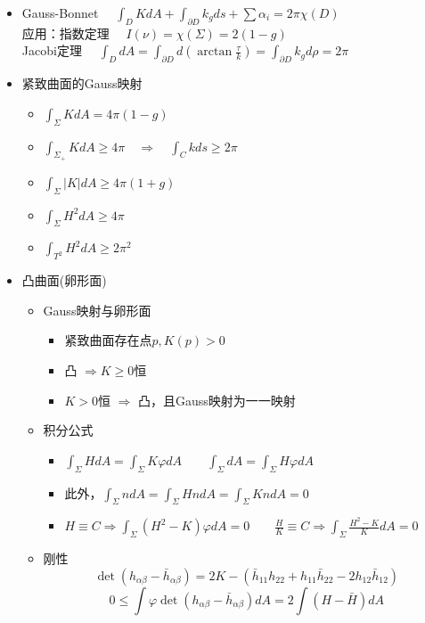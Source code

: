 \documentclass{ctexart}
\begin{document}
\begin{itemize}
	\item Gauss-Bonnet $\displaystyle\quad \int_{D}KdA+\int_{\partial D}k_g ds +\sum \alpha_i =2\pi \chi(D)$\\[0.3cm]
	应用：指数定理 $\quad I(\nu) =\chi (\Sigma) =2(1-g)$\\[0.15cm]
	\phantom{应用：}Jacobi定理 $\displaystyle\quad \int_{D}dA=\int_{\partial D} d(\arctan \frac{\tau}{k})=\int_{\partial D}k_gd\rho =2\pi$
	\item 紧致曲面的Gauss映射
	\begin{itemize}
		\item $\displaystyle \int_{\Sigma}KdA=4\pi(1-g)$
		\item $\displaystyle\int_{\Sigma_+}KdA \geqslant 4\pi \quad \Rightarrow \quad \int_{C}kds \geqslant 2\pi$
		\item $\displaystyle\int_{\Sigma}|K|dA \geqslant 4\pi(1+g)$
		\item $\displaystyle\int_{\Sigma}H^2dA \geqslant 4\pi$
		\item $\displaystyle\int_{T^2}H^2dA \geqslant 2\pi^2$
	\end{itemize}
	\item 凸曲面(卵形面)
	\begin{itemize}
		\item Gauss映射与卵形面
		\begin{itemize}
			\item 紧致曲面存在点$p, K(p)>0$
			\item 凸 $\Rightarrow K \geqslant 0$恒
			\item $K>0$恒 $\Rightarrow$ 凸，且Gauss映射为一一映射
		\end{itemize}
		\item 积分公式
		\begin{itemize}
			\item $\displaystyle\int_{\Sigma}HdA=\int_{\Sigma}K\varphi dA \qquad \int_{\Sigma}dA=\int_{\Sigma}H\varphi dA$
			\item 此外，$\displaystyle\int_{\Sigma}ndA=\int_{\Sigma}HndA=\int_{\Sigma}KndA=0$
			\item $\displaystyle H \equiv C \Rightarrow \int_{\Sigma}(H^2-K)\varphi dA=0 \qquad \frac{H}{K} \equiv C \Rightarrow \int_{\Sigma}\frac{H^2-K}{K}dA=0$
		\end{itemize}
		\item 刚性
		$$\det (h_{\alpha\beta}-\bar{h}_{\alpha\beta})=2K-(\bar{h}_{11}h_{22}+h_{11}\bar{h}_{22}-2h_{12}\bar{h}_{12})$$
		$$0\leqslant \int \varphi \det(h_{\alpha\beta}-\bar{h}_{\alpha\beta})dA =2 \int(H-\bar{H})dA$$
	\end{itemize}
\end{itemize}
\end{document}

